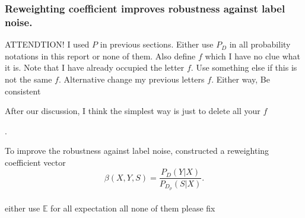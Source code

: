 \documentclass[12pt]{article} %
\begin{document}
\subsubsection{Reweighting coefficient improves robustness against label noise.}
{\color{red} ATTENDTION! I used $P$ in previous sections. Either use $P_D$ in all probability notations in this report or none of them. Also define $f$ which I have no clue what it is. Note that I have already occupied the letter $f$. Use something else if this is not the same $f$. Alternative change my previous letters $f$. Either way, Be consistent

After our discussion, I think the simplest way is just to delete all your $f$}.

To improve the robustness against label noise, \citet{liu2016classification} constructed a reweighting coefficient vector~
\begin{equation}
\beta(X,Y,S)=\frac{P_D(Y|X)}{P_{D_\rho}(S|X)}. \label{beta} 
\end{equation}
\\{\color{red} either use $\mathbb E$ for all expectation all none of them please fix}\\%
\end{document}
